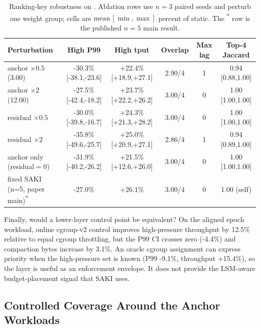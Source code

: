 \begin{table}[!t]
  \centering
  \caption{Ranking-key robustness on \runtimedrift. Ablation rows use
  $n{=}3$ paired seeds and perturb one weight group; cells are
  $\mathrm{mean}\,[\min,\max]$ percent of static. The \textsuperscript{*} row
  is the published $n{=}5$ main result.}
  \label{tab:coefficient-ablation}
  \small
  \setlength{\tabcolsep}{4pt}
  \begin{tabular}{lccccc}
    \toprule
    Perturbation & High P99 & High tput & Overlap & Max lag & Top-4 Jaccard \\
    \midrule
    anchor $\times 0.5$ (3.00)        & -30.3\% [-38.1,-23.6] & +22.4\% [+18.9,+27.1] & 2.90/4 & 1 & 0.94 [0.88,1.00] \\
    anchor $\times 2$ (12.00)         & -27.5\% [-42.4,-18.2] & +23.7\% [+22.2,+26.2] & 3.00/4 & 0 & 1.00 [1.00,1.00] \\
    residual $\times 0.5$             & -30.0\% [-39.8,-16.7] & +24.3\% [+21.3,+28.2] & 3.00/4 & 0 & 1.00 [1.00,1.00] \\
    residual $\times 2$               & -35.8\% [-49.6,-25.7] & +25.0\% [+20.9,+27.1] & 2.86/4 & 1 & 0.94 [0.89,1.00] \\
    anchor only (residual$=0$)        & -31.9\% [-40.2,-26.2] & +21.5\% [+12.6,+26.0] & 3.00/4 & 0 & 1.00 [1.00,1.00] \\
    \midrule
    fixed SAKI (n=5, paper main)\textsuperscript{*} & -27.0\% & +26.1\% & 3.00/4 & 0 & 1.00 (self) \\
    \bottomrule
  \end{tabular}
\end{table}

Finally, would a lower-layer control point be equivalent?
On the aligned epoch workload, online cgroup-v2 control improves high-pressure
throughput by 12.5\% relative to equal cgroup throttling, but the P99 CI
crosses zero (-4.4\%) and compaction bytes increase by 3.1\%. An oracle cgroup
assignment can express priority when the high-pressure set is known (P99
-9.1\%, throughput +15.4\%), so the layer is useful as an enforcement
envelope. It does not provide the LSM-aware budget-placement signal that SAKI
uses.

\subsection{Controlled Coverage Around the Anchor Workloads}
\label{sec:workload-matrix}


